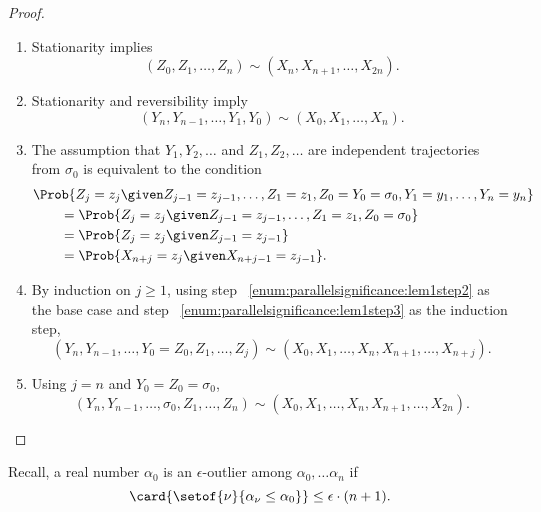 \documentclass[12pt]{article}
\begin{document}
\begin{proof}
    \begin{enumerate}
        \item
            Stationarity implies
            \[
                (Z_0, Z_1, \dots, Z_n) \sim (X_n, X_{n+1}, \dots, X_{2n}).
            \]
        \item
            \label{enum:parallelsignificance:lem1step2} Stationarity and
            reversibility imply
            \[
                (Y_n, Y_{n-1}, \dots, Y_1, Y_0) \sim (X_0, X_1, \dots, X_n).
            \]
        \item
            \label{enum:parallelsignificance:lem1step3} The assumption
            that \( Y_1, Y_2, \dots \) and \( Z_1, Z_2, \dots \) are
            independent trajectories from \( \sigma_0 \) is equivalent
            to the condition
            \begin{align*}
                & \Prob{ Z_j = z_j \given Z_{j-1} = z_{j-1}, \dots, Z_1
                = z_1, Z_0 = Y_0=\sigma_0, Y_1=y_1, \dots, Y_n = y_n} \\
                & \qquad = \Prob{ Z_j = z_j \given Z_{j-1} = z_{j-1},
                \dots, Z_1 = z_1, Z_0 = \sigma_0} \\
                & \qquad = \Prob{ Z_j = z_j \given Z_{j-1} = z_{j-1}} \\
                &\qquad = \Prob{ X_{n+j} = z_j \given X_{n+j-1} = z_{j-1}}.
            \end{align*}
        \item
            By induction on \( j \ge 1 \), using step~%
            \ref{enum:parallelsignificance:lem1step2} as the base case
            and step~%
            \ref{enum:parallelsignificance:lem1step3} as the induction
            step,
            \[
                (Y_n, Y_{n-1}, \dots, Y_0=Z_0, Z_1, \dots, Z_j) \sim (X_0,
                X_1, \dots, X_n, X_{n+1}, \dots, X_{n+j}).
            \]
        \item
            Using \( j = n \) and \( Y_0 = Z_0 = \sigma_0 \),
            \[
                (Y_n, Y_{n-1}, \dots, \sigma_0, Z_1, \dots, Z_n) \sim (X_0,
                X_1, \dots, X_n, X_{n+1}, \dots, X_{2n}).
            \]
    \end{enumerate}
\end{proof}

Recall, a real number \( \alpha_0 \) is an \( \epsilon \)-outlier among \(
\alpha_0, \dots \alpha_n \) if
\[
    \card{\setof{\nu}{ \alpha_{\nu} \le \alpha_0 }} \le \epsilon \cdot (n+1).
\]
\end{document}
